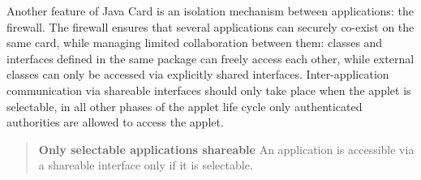 Another feature of Java Card is an isolation mechanism between
applications: the firewall. The firewall ensures that several
applications can securely co-exist on the same card, while managing
limited collaboration between them: classes and interfaces defined in
the same package can freely access each other, while external classes
can only be accessed via explicitly shared
interfaces. Inter-application communication via shareable interfaces
should only take place when the applet is selectable, in all other
phases of the applet life cycle only authenticated authorities are
allowed to access the applet. 
\begin{quote}
\textbf{Only selectable applications shareable} An application is accessible
via a shareable interface only if it is selectable.
\end{quote}

